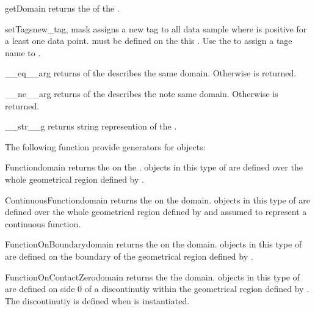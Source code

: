 \begin{methoddesc}[FunctionSpace]{getDomain}{}
returns the \Domain of the \FunctionSpace.
\end{methoddesc}

\begin{methoddesc}[FunctionSpace]{setTags}{new_tag, mask}
assigns a new tag  to all data sample 
where  is positive for a least one data point. 
 must be defined on the this \FunctionSpace.
Use the  to assign a tage name to .
\end{methoddesc}

\begin{methoddesc}[FunctionSpace]{__eq__}{arg}
returns \True of the \Domain {} describes the same domain. Otherwise
\False is returned.
\end{methoddesc}

\begin{methoddesc}[FunctionSpace]{__ne__}{arg}
returns \True of the \Domain {} describes the note same domain. 
Otherwise \False is returned.
\end{methoddesc}

\begin{methoddesc}[Domain]{__str__}{g}
returns string represention of the \Domain.
\end{methoddesc}

The following function provide generators for \FunctionSpace objects:
\begin{funcdesc}{Function}{domain}
returns the \Function on the \Domain {}. \Data objects in this type of \Function
are defined over the whole geometrical region defined by . 
\end{funcdesc}

\begin{funcdesc}{ContinuousFunction}{domain}
returns the \ContinuousFunction on the \Domain domain. \Data objects in this type of \Function
are defined over the whole geometrical region defined by  and assumed to represent
a continuous function.
\end{funcdesc}

\begin{funcdesc}{FunctionOnBoundary}{domain}
returns the \ContinuousFunction on the \Domain domain. \Data objects in this type of \Function
are defined on the boundary of the geometrical region defined by . 
\end{funcdesc}

\begin{funcdesc}{FunctionOnContactZero}{domain}
returns the \FunctionOnContactZero the \Domain domain. \Data objects in this type of \Function
are defined on side 0 of a discontinutiy  within the geometrical region defined by .
The discontinutiy is defined when  is instantiated.
\end{funcdesc}

